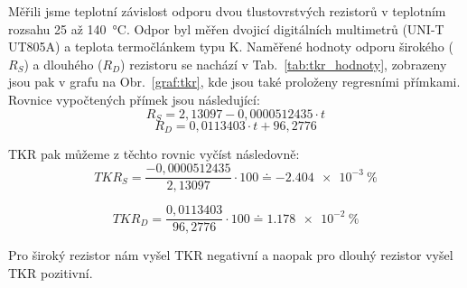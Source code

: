 Měřili jsme teplotní závislost odporu dvou tlustovrstvých rezistorů v teplotním rozsahu 25 až \qty{140}{\degreeCelsius}. Odpor byl měřen dvojicí digitálních multimetrů (UNI-T UT805A) a teplota termočlánkem typu K. Naměřené hodnoty odporu širokého (\(R_{S} \)) a dlouhého (\(R_{D } \)) rezistoru se nachází v Tab.~\ref{tab:tkr_hodnoty}, zobrazeny jsou pak v grafu na Obr.~\ref{graf:tkr}, kde jsou také proloženy regresními přímkami. Rovnice vypočtených přímek jsou následující:
\[
    R_{S} = 2,13097-0,0000512435\cdot t
\]
\[
    R_{D} = 0,0113403\cdot t +96,2776
\]

TKR pak můžeme z těchto rovnic vyčíst následovně:
\[
    TKR_{S} = \frac{-0,0000512435}{2,13097}\cdot 100 \doteq \qty{-2,404e-3}{\percent}
\]

\[
    TKR_{D} = \frac{0,0113403}{96,2776}\cdot 100 \doteq \qty{1,178e-2}{\percent}
\]

Pro široký rezistor nám vyšel TKR negativní a naopak pro dlouhý rezistor vyšel TKR pozitivní.

